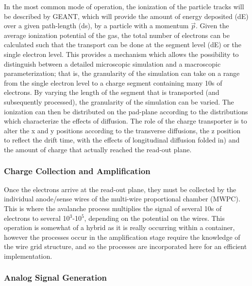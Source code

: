 \documentclass[twoside]{article}
\begin{document}
In the most common mode of operation, the ionization of the particle 
tracks will be described
by GEANT, which will provide the amount of energy deposited (dE) 
over a given path-length (ds), by a particle with a momentum $\vec{p}$.
Given the average ionization potential of the gas, the total number of 
electrons can be calculated such that the transport can be done at the
segment level (dE) or the single electron level.  This provides a mechanism 
which allows the possibility to distinguish between a detailed microscopic 
simulation and
a macroscopic parameterization; that is, the granularity of the simulation
can take on a range from the single electron level to a charge segment
containing many 10s of electrons.
By varying the length of the segment that is transported (and subsequently
processed), the granularity of the simulation can be varied.  The ionization
can then be distributed on the pad-plane according to the distributions
which characterize the effects of diffusion.  The role of the charge 
transporter is
to alter the x and y positions according to the transverse diffusions, the
z position to reflect the drift time, with the effects of longitudinal
diffusion folded in) and the amount of charge that actually reached the
read-out plane.

\subsubsection{Charge Collection and Amplification}
\label{sec:chargeCollection}

Once the electrons arrive at the read-out plane, they must be 
collected by the individual anode/sense wires of the multi-wire 
proportional chamber (MWPC).
This is where the avalanche process multiplies
the signal of several 10s of electrons to several 10$^{3}$-10$^{5}$, depending
on the potential on the wires.  This operation is somewhat of a hybrid as
it is really occurring within a container, however the processes
occur in the amplification
stage require the knowledge of the wire grid structure, and so the
processes are incorporated here for an efficient implementation.

\subsubsection{Analog Signal Generation}
\label{sec:analogSignalGeneration}
\end{document}
